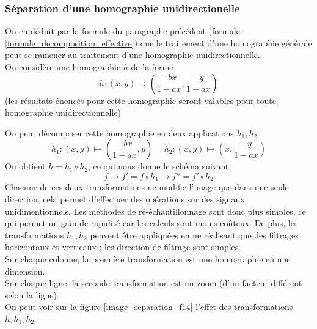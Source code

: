 \subsubsection{Séparation d'une homographie unidirectionelle}
\label{homobox_paragraph}
On en déduit par la formule du paragraphe précédent (formule \ref{formule_decomposition_effective}) que le traitement d'une homographie générale peut se ramener au traitement d'une homographie unidirectionnelle.\\
On considère une homographie  $h$ de la forme 
\begin{equation*}
h:(x,y)\mapsto \left(\frac{-bx}{1-ax},\frac{-y}{1-ax}\right)
\end{equation*}
(les résultats énoncés pour cette homographie seront valables pour toute homographie unidirectionnelle)

On peut décomposer cette homographie en deux applications $h_1 , h_2$
\begin{equation*}
h_1:(x,y) \mapsto \left(\frac{-bx}{1-ax},y\right)~~~~~~h_2:(x,y) \mapsto \left(x,\frac{-y}{1-ax}\right)
\end{equation*}
On obtient $h=h_1  \circ h_2$, ce qui nous donne le schéma suivant 
\begin{equation*}
f\longrightarrow f'=f\circ h_1 \longrightarrow f''=f'\circ h_2
\end{equation*}
Chacune de ces deux transformations ne modifie l'image que dans une seule direction, cela permet d'effectuer des opérations sur des signaux unidimentionnels. Les méthodes de ré-échantillonnage sont donc plus simples, ce qui permet un gain de rapidité car les calculs sont moins coûteux. De plus, les transformations $h_1,h_2$ peuvent être appliquées en ne réalisant que des filtrages horizontaux et verticaux ; les direction de filtrage sont simples.\\ 
Sur chaque colonne, la première transformation est une homographie en une dimension.\\ 
Sur chaque ligne, la seconde transformation est un zoom (d'un facteur différent selon la ligne).\\
On peut voir sur la figure \ref{image_separation_f14} l'effet des transformations $h,h_1,h_2$.\\


